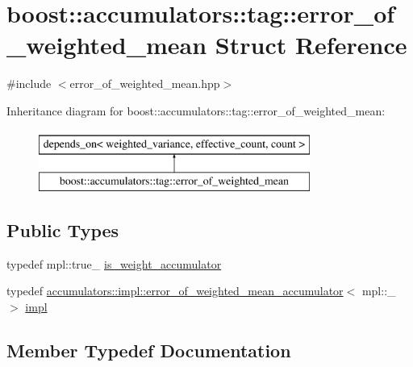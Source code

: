 \hypertarget{structboost_1_1accumulators_1_1tag_1_1error__of__weighted__mean}{}\section{boost\+:\+:accumulators\+:\+:tag\+:\+:error\+\_\+of\+\_\+weighted\+\_\+mean Struct Reference}
\label{structboost_1_1accumulators_1_1tag_1_1error__of__weighted__mean}


{\ttfamily \#include $<$error\+\_\+of\+\_\+weighted\+\_\+mean.\+hpp$>$}

Inheritance diagram for boost\+:\+:accumulators\+:\+:tag\+:\+:error\+\_\+of\+\_\+weighted\+\_\+mean\+:\begin{figure}[H]
\begin{center}
\leavevmode
\includegraphics[height=2.000000cm]{structboost_1_1accumulators_1_1tag_1_1error__of__weighted__mean}
\end{center}
\end{figure}
\subsection*{Public Types}
\begin{DoxyCompactItemize}
\item 
typedef mpl\+::true\+\_\+ \hyperlink{structboost_1_1accumulators_1_1tag_1_1error__of__weighted__mean_a2e976c79a2aa15620a504bd4c87ee9bf}{is\+\_\+weight\+\_\+accumulator}
\item 
typedef \hyperlink{structboost_1_1accumulators_1_1impl_1_1error__of__weighted__mean__accumulator}{accumulators\+::impl\+::error\+\_\+of\+\_\+weighted\+\_\+mean\+\_\+accumulator}$<$ mpl\+::\+\_ $>$ \hyperlink{structboost_1_1accumulators_1_1tag_1_1error__of__weighted__mean_a9e77d0056f0d9b30589fbf40c57cf25d}{impl}
\end{DoxyCompactItemize}


\subsection{Member Typedef Documentation}
\hypertarget{structboost_1_1accumulators_1_1tag_1_1error__of__weighted__mean_a9e77d0056f0d9b30589fbf40c57cf25d}{}
